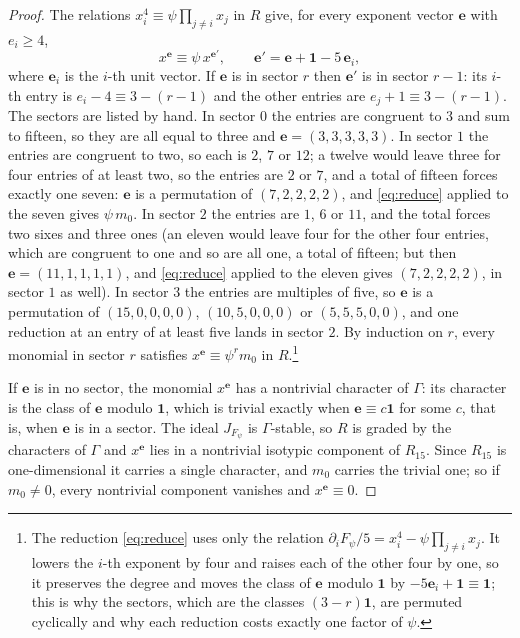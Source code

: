 \documentclass[11pt]{amsart}
\theoremstyle{definition}
\theoremstyle{remark}
\newcommand{\ee}{\mathbf{e}}
\newcommand{\one}{\mathbf{1}}
\begin{document}
\begin{proof}
The relations $x_i^4\equiv\psi\prod_{j\ne i}x_j$ in $R$ give, for every
exponent vector $\ee$ with $e_i\ge4$,
\begin{equation}\label{eq:reduce}
x^{\ee}\equiv\psi\,x^{\ee'},\qquad \ee'=\ee+\one-5\,\ee_i,
\end{equation}
where $\ee_i$ is the $i$-th unit vector. If $\ee$ is in sector $r$ then
$\ee'$ is in sector $r-1$: its $i$-th entry is $e_i-4\equiv 3-(r-1)$ and the
other entries are $e_j+1\equiv3-(r-1)$. The sectors are listed by hand. In
sector $0$ the entries are congruent to $3$ and sum to fifteen, so they are
all equal to three and $\ee=(3,3,3,3,3)$. In sector $1$ the entries are congruent to
two, so each is $2$, $7$ or $12$; a twelve would leave three for four
entries of at least two, so the entries are $2$ or $7$, and a total of
fifteen forces exactly one seven: $\ee$ is a
permutation of $(7,2,2,2,2)$, and \eqref{eq:reduce} applied to the seven
gives $\psi\,m_0$. In sector $2$ the entries are $1$, $6$ or $11$, and the
total forces two sixes and three ones (an eleven would leave four for the
other four entries, which are congruent to one and so are all one, a total
of fifteen; but then $\ee=(11,1,1,1,1)$, and \eqref{eq:reduce} applied to
the eleven gives $(7,2,2,2,2)$, in sector $1$ as well). In sector $3$ the
entries are multiples of five, so $\ee$ is a permutation of $(15,0,0,0,0)$,
$(10,5,0,0,0)$ or $(5,5,5,0,0)$, and one reduction at an entry of at least
five lands in sector $2$. By induction on $r$, every monomial in sector $r$
satisfies $x^{\ee}\equiv\psi^rm_0$ in $R$.\footnote{The reduction
\eqref{eq:reduce} uses only the relation $\partial_iF_\psi/5=x_i^4-\psi
\prod_{j\ne i}x_j$. It lowers the $i$-th exponent by four and raises each of
the other four by one, so it preserves the degree and moves the class of
$\ee$ modulo $\one$ by $-5\ee_i+\one\equiv\one$; this is why the sectors,
which are the classes $(3-r)\one$, are permuted cyclically and why each
reduction costs exactly one factor of $\psi$.}

If $\ee$ is in no sector, the monomial $x^{\ee}$ has a nontrivial character
of $\Gamma$: its character is the class of $\ee$ modulo $\one$, which is
trivial exactly when $\ee\equiv c\one$ for some $c$, that is, when $\ee$ is
in a sector. The ideal $J_{F_\psi}$ is $\Gamma$-stable, so $R$ is graded by
the characters of $\Gamma$ and $x^{\ee}$ lies in a nontrivial isotypic
component of $R_{15}$. Since $R_{15}$ is one-dimensional it carries a single
character, and $m_0$ carries the trivial one; so if $m_0\ne0$, every
nontrivial component vanishes and $x^{\ee}\equiv0$.


\end{proof}
\end{document}
